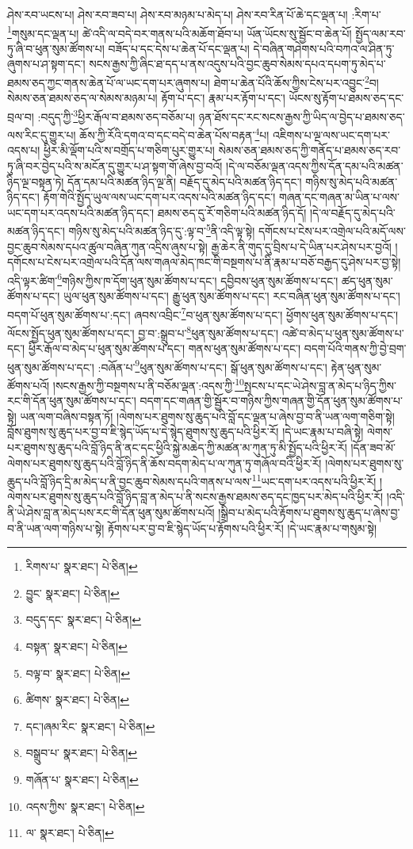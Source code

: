 ཤེས་རབ་ཡངས་པ། ཤེས་རབ་ཟབ་པ། ཤེས་རབ་མཉམ་པ་མེད་པ། ཤེས་རབ་རིན་པོ་ཆེ་དང་ལྡན་པ། :རིག་པ་\footnote{རིགས་པ་  སྣར་ཐང་།  པེ་ཅིན། }གསུམ་དང་ལྡན་པ། ཚེ་འདི་ལ་བདེ་བར་གནས་པའི་མཆོག་ཐོབ་པ། ཡོན་ཡོངས་སུ་སྦྱོང་བ་ཆེན་པོ། སྤྱོད་ལམ་རབ་ཏུ་ཞི་བ་ཕུན་སུམ་ཚོགས་པ། བཟོད་པ་དང་དེས་པ་ཆེན་པོ་དང་ལྡན་པ། དེ་བཞིན་གཤེགས་པའི་བཀའ་ལ་ཤིན་ཏུ་ཞུགས་པ་ཤ་སྟག་དང་། སངས་རྒྱས་ཀྱི་ཞིང་ཐ་དད་པ་ནས་འདུས་པའི་བྱང་ཆུབ་སེམས་དཔའ་དཔག་ཏུ་མེད་པ་ཐམས་ཅད་ཀྱང་གནས་ཆེན་པོ་ལ་ཡང་དག་པར་ཞུགས་པ། ཐེག་པ་ཆེན་པོའི་ཆོས་ཀྱིས་ངེས་པར་འབྱུང་\footnote{བྱུང་  སྣར་ཐང་།  པེ་ཅིན། }བ། སེམས་ཅན་ཐམས་ཅད་ལ་སེམས་མཉམ་པ། རྟོག་པ་དང་། རྣམ་པར་རྟོག་པ་དང་། ཡོངས་སུ་རྟོག་པ་ཐམས་ཅད་དང་བྲལ་བ། :བདུད་ཀྱི་\footnote{བདུད་དང་  སྣར་ཐང་།  པེ་ཅིན། }ཕྱིར་རྒོལ་བ་ཐམས་ཅད་བཅོམ་པ། ཉན་ཐོས་དང་རང་སངས་རྒྱས་ཀྱི་ཡིད་ལ་བྱེད་པ་ཐམས་ཅད་ལས་རིང་དུ་གྱུར་པ། ཆོས་ཀྱི་རོའི་དགའ་བ་དང་བདེ་བ་ཆེན་པོས་བརྟན་\footnote{བསྟན་  སྣར་ཐང་།  པེ་ཅིན། }པ། འཇིགས་པ་ལྔ་ལས་ཡང་དག་པར་འདས་པ། ཕྱིར་མི་ལྡོག་པའི་ས་བགྲོད་པ་གཅིག་པུར་གྱུར་པ། སེམས་ཅན་ཐམས་ཅད་ཀྱི་གནོད་པ་ཐམས་ཅད་རབ་ཏུ་ཞི་བར་བྱེད་པའི་ས་མངོན་དུ་གྱུར་པ་ཤ་སྟག་གོ་ཞེས་བྱ་བའོ། །དེ་ལ་བཅོམ་ལྡན་འདས་ཀྱིས་དོན་དམ་པའི་མཚན་ཉིད་ལྔ་བསྟན་ཏེ། དོན་དམ་པའི་མཚན་ཉིད་ལྔ་ནི། བརྗོད་དུ་མེད་པའི་མཚན་ཉིད་དང་། གཉིས་སུ་མེད་པའི་མཚན་ཉིད་དང་། རྟོག་གེའི་སྤྱོད་ཡུལ་ལས་ཡང་དག་པར་འདས་པའི་མཚན་ཉིད་དང་། གཞན་དང་གཞན་མ་ཡིན་པ་ལས་ཡང་དག་པར་འདས་པའི་མཚན་ཉིད་དང་། ཐམས་ཅད་དུ་རོ་གཅིག་པའི་མཚན་ཉིད་དོ། །དེ་ལ་བརྗོད་དུ་མེད་པའི་མཚན་ཉིད་དང་། གཉིས་སུ་མེད་པའི་མཚན་ཉིད་དུ་:ལྟ་བ་\footnote{བལྟ་བ་  སྣར་ཐང་།  པེ་ཅིན། }ནི་འདི་ལྟ་སྟེ། དགོངས་པ་ངེས་པར་འགྲེལ་པའི་མདོ་ལས་བྱང་ཆུབ་སེམས་དཔའ་ཚུལ་བཞིན་ཀུན་འདྲིས་ཞུས་པ་སྟེ། རྒྱ་ཆེར་ནི་གུད་དུ་བྲིས་པ་དེ་ཡིན་པར་ཤེས་པར་བྱའོ། །དགོངས་པ་ངེས་པར་འགྲེལ་པའི་དོན་ལས་གཞལ་མེད་ཁང་གི་བསྔགས་པ་ནི་རྣམ་པ་བཅོ་བརྒྱད་དུ་ཤེས་པར་བྱ་སྟེ། འདི་ལྟར་ཚིག་\footnote{ཚིགས་  སྣར་ཐང་།  པེ་ཅིན། }གཉིས་ཀྱིས་ཁ་དོག་ཕུན་སུམ་ཚོགས་པ་དང་། དབྱིབས་ཕུན་སུམ་ཚོགས་པ་དང་། ཚད་ཕུན་སུམ་ཚོགས་པ་དང་། ཡུལ་ཕུན་སུམ་ཚོགས་པ་དང་། རྒྱུ་ཕུན་སུམ་ཚོགས་པ་དང་། རང་བཞིན་ཕུན་སུམ་ཚོགས་པ་དང་། བདག་པོ་ཕུན་སུམ་ཚོགས་པ་:དང་། ཞབས་འབྲིང་\footnote{དང་།ཞམ་རིང་  སྣར་ཐང་།  པེ་ཅིན། }བ་ཕུན་སུམ་ཚོགས་པ་དང་། ཕྱོགས་ཕུན་སུམ་ཚོགས་པ་དང་། ལོངས་སྤྱོད་ཕུན་སུམ་ཚོགས་པ་དང་། བྱ་བ་:སྒྲུབ་པ་\footnote{བསྒྲུབ་པ་  སྣར་ཐང་།  པེ་ཅིན། }ཕུན་སུམ་ཚོགས་པ་དང་། འཚེ་བ་མེད་པ་ཕུན་སུམ་ཚོགས་པ་དང་། ཕྱིར་རྒོལ་བ་མེད་པ་ཕུན་སུམ་ཚོགས་པ་དང་། གནས་ཕུན་སུམ་ཚོགས་པ་དང་། བདག་པོའི་གནས་ཀྱི་བྱེ་བྲག་ཕུན་སུམ་ཚོགས་པ་དང་། :བཞོན་པ་\footnote{གཞོན་པ་  སྣར་ཐང་།  པེ་ཅིན། }ཕུན་སུམ་ཚོགས་པ་དང་། སྒོ་ཕུན་སུམ་ཚོགས་པ་དང་། རྟེན་ཕུན་སུམ་ཚོགས་པའོ། །སངས་རྒྱས་ཀྱི་བསྔགས་པ་ནི་བཅོམ་ལྡན་:འདས་ཀྱི་\footnote{འདས་ཀྱིས་  སྣར་ཐང་།  པེ་ཅིན། }སྤངས་པ་དང་ཡེ་ཤེས་བླ་ན་མེད་པ་ཉིད་ཀྱིས་རང་གི་དོན་ཕུན་སུམ་ཚོགས་པ་དང་། བདག་དང་གཞན་གྱི་སྦྱོར་བ་གཉིས་ཀྱིས་གཞན་གྱི་དོན་ཕུན་སུམ་ཚོགས་པ་སྟེ། ཡན་ལག་བཞིས་བསྟན་ཏོ། །ལེགས་པར་ཐུགས་སུ་ཆུད་པའི་བློ་དང་ལྡན་པ་ཞེས་བྱ་བ་ནི་ཡན་ལག་གཅིག་སྟེ། བློས་ཐུགས་སུ་ཆུད་པར་བྱ་བ་ཇི་སྙེད་ཡོད་པ་དེ་སྙེད་ཐུགས་སུ་ཆུད་པའི་ཕྱིར་རོ། །དེ་ཡང་རྣམ་པ་བཞི་སྟེ། ལེགས་པར་ཐུགས་སུ་ཆུད་པའི་བློ་ཉིད་ནི་ནང་དང་ཕྱིའི་སྐྱེ་མཆེད་ཀྱི་མཚན་མ་ཀུན་ཏུ་མི་སྤྱོད་པའི་ཕྱིར་རོ། །དོན་ཟབ་མོ་ལེགས་པར་ཐུགས་སུ་ཆུད་པའི་བློ་ཉིད་ནི་ཆོས་བདག་མེད་པ་ལ་ཀུན་ཏུ་གཞོལ་བའི་ཕྱིར་རོ། །ལེགས་པར་ཐུགས་སུ་ཆུད་པའི་བློ་ཉིད་དྲི་མ་མེད་པ་ནི་བྱང་ཆུབ་སེམས་དཔའི་གནས་པ་ལས་\footnote{ལ་  སྣར་ཐང་།  པེ་ཅིན། }ཡང་དག་པར་འདས་པའི་ཕྱིར་རོ། །ལེགས་པར་ཐུགས་སུ་ཆུད་པའི་བློ་ཉིད་བླ་ན་མེད་པ་ནི་སངས་རྒྱས་ཐམས་ཅད་དང་ཁྱད་པར་མེད་པའི་ཕྱིར་རོ། །འདི་ནི་ཡེ་ཤེས་བླ་ན་མེད་པས་རང་གི་དོན་ཕུན་སུམ་ཚོགས་པའོ། །སྒྲིབ་པ་མེད་པའི་རྟོགས་པ་ཐུགས་སུ་ཆུད་པ་ཞེས་བྱ་བ་ནི་ཡན་ལག་གཉིས་པ་སྟེ། རྟོགས་པར་བྱ་བ་ཇི་སྙེད་ཡོད་པ་རྟོགས་པའི་ཕྱིར་རོ། །དེ་ཡང་རྣམ་པ་གསུམ་སྟེ། 
